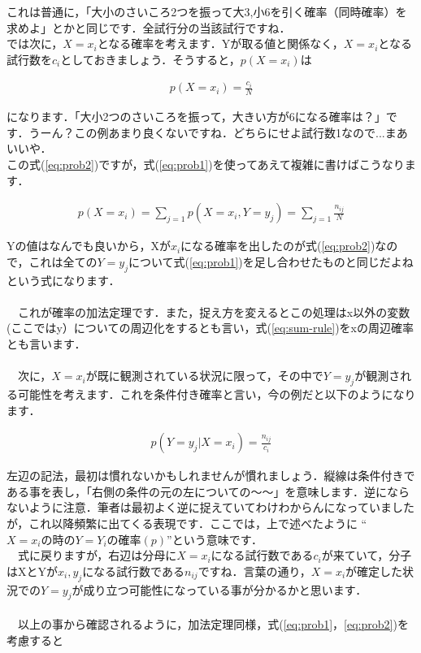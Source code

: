 \documentclass[11pt,a4paper,uplatex]{ujreport} 	%
\begin{document}
これは普通に，「大小のさいころ2つを振って大3,小6を引く確率（同時確率）を求めよ」とかと同じです．全試行分の当該試行ですね．
\\

では次に，$X=x_i$となる確率を考えます．Yが取る値と関係なく，$X=x_i$となる試行数を$c_i$としておきましょう．そうすると，$p(X=x_i)$は

\begin{align}
\label{eq:prob2}
p(X=x_i) = \frac{c_i}{N}
\end{align}

になります．「大小2つのさいころを振って，大きい方が6になる確率は？」です．うーん？この例あまり良くないですね．どちらにせよ試行数1なので...まあいいや．\\

この式(\ref{eq:prob2})ですが，式(\ref{eq:prob1})を使ってあえて複雑に書けばこうなります．

\begin{align}
\label{eq:sum-rule}
p(X=x_i) = \sum_{j=1} p(X=x_i, Y=y_j) = \sum_{j=1} \frac{n_{ij}}{N}
\end{align}

Yの値はなんでも良いから，Xが$x_i$になる確率を出したのが式(\ref{eq:prob2})なので，これは全ての$Y=y_j$について式(\ref{eq:prob1})を足し合わせたものと同じだよねという式になります．\\
\\
　これが確率の加法定理です．また，捉え方を変えるとこの処理はx以外の変数(ここではy）についての周辺化をするとも言い，式(\ref{eq:sum-rule})をxの周辺確率とも言います．\\
\\
　次に，$X=x_i$が既に観測されている状況に限って，その中で$Y=y_j$が観測される可能性を考えます．これを条件付き確率と言い，今の例だと以下のようになります．

\begin{align}
\label{eq:conditional}
p(Y=y_j | X=x_i) = \frac{n_{ij}}{c_i}
\end{align}

左辺の記法，最初は慣れないかもしれませんが慣れましょう．縦線は条件付きである事を表し，「右側の条件の元の左についての～～」を意味します．逆にならないように注意．筆者は最初よく逆に捉えていてわけわからんになっていましたが，これ以降頻繁に出てくる表現です．ここでは，上で述べたように ``$X=x_iの時のY=Y_iの確率(p)$''という意味です．\\
　式に戻りますが，右辺は分母に$X=x_i$になる試行数である$c_i$が来ていて，分子はXとYが$x_i, y_j$になる試行数である$n_{ij}$ですね．言葉の通り，$X=x_i$が確定した状況での$Y=y_j$が成り立つ可能性になっている事が分かるかと思います．\\
\\
　以上の事から確認されるように，加法定理同様，式(\ref{eq:prob1}，\ref{eq:prob2})を考慮すると
\end{document}

